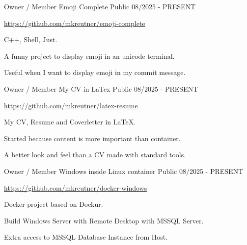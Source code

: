

\begin{cventries}

  \cventry
    {Owner / Member} %
    {Emoji Complete} %
    {Public} %
    {08/2025 - PRESENT} %
    {
      \url{https://github.com/mkreutner/emoji-complete}
      \newline \vspace{12pt}
      \begin{cvitems} %
        \item {C++, Shell, Just.}
        \item {A funny project to display emoji in an unicode terminal.}
        \item {Useful when I want to display emoji in my commit message.}
      \end{cvitems}
    }

  \cventry
    {Owner / Member} %
    {My CV in LaTex} %
    {Public} %
    {08/2025 - PRESENT} %
    {
      \url{https://github.com/mkreutner/latex-resume}
      \newline \vspace{12pt}
      \begin{cvitems} %
        \item {My CV, Resume and Coverletter in LaTeX.}
        \item {Started because content is more important than container.}
        \item {A better look and feel than a CV made with standard tools.}
      \end{cvitems}
    }

  \cventry
    {Owner / Member} %
    {Windows inside Linux container} %
    {Public} %
    {08/2025 - PRESENT} %
    {
      \url{https://github.com/mkreutner/docker-windows}
      \newline \vspace{12pt}
      \begin{cvitems} %
        \item {Docker project based on Dockur.}
        \item {Build Windows Server with Remote Desktop with MSSQL Server.}
        \item {Extra access to MSSQL Database Instance from Host.}
      \end{cvitems}
    }


\end{cventries}
